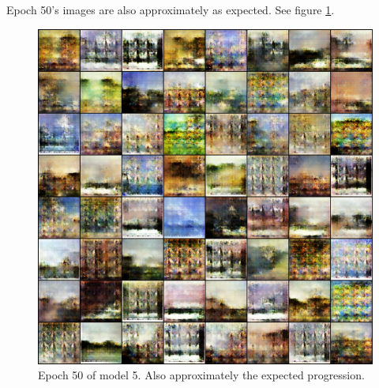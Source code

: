 \documentclass[11pt,letterpaper]{article}
\begin{document}
				Epoch 50's images are also approximately as expected.
				See figure \ref{fig:wa128:epoch050generator}.
				\begin{figure}
					\centering
					\includegraphics[width=1.0\linewidth]{results/model5/epoch050_generator}
					\caption{Epoch 50 of model 5. Also approximately the expected progression.}
					\label{fig:wa128:epoch050generator}
				\end{figure}
\end{document}
